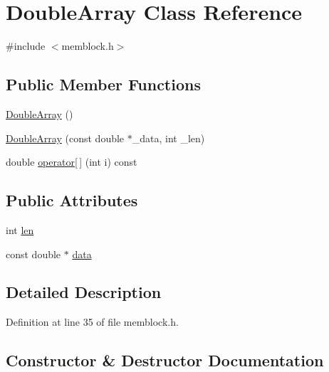 \hypertarget{class_double_array}{}\section{Double\+Array Class Reference}
\label{class_double_array}


{\ttfamily \#include $<$memblock.\+h$>$}

\subsection*{Public Member Functions}
\begin{DoxyCompactItemize}
\item 
\hyperlink{class_double_array_a260af75f1728ea6b65789f917c3330f6}{Double\+Array} ()
\item 
\hyperlink{class_double_array_a7f0f4d9ff32906c63cdc010285ca7395}{Double\+Array} (const double $\ast$\+\_\+data, int \+\_\+len)
\item 
double \hyperlink{class_double_array_acb83f11d843327f229a970f9b30f4943}{operator\mbox{[}$\,$\mbox{]}} (int i) const
\end{DoxyCompactItemize}
\subsection*{Public Attributes}
\begin{DoxyCompactItemize}
\item 
int \hyperlink{class_double_array_abc24e239c776778cbad861e6554d7fac}{len}
\item 
const double $\ast$ \hyperlink{class_double_array_ab72e768a1b0bed05e975bc9a3e87cc6a}{data}
\end{DoxyCompactItemize}


\subsection{Detailed Description}


Definition at line 35 of file memblock.\+h.



\subsection{Constructor \& Destructor Documentation}
\mbox{\label{class_double_array_a260af75f1728ea6b65789f917c3330f6}} 
